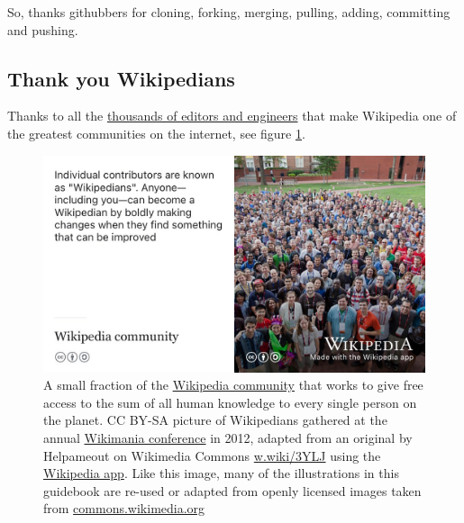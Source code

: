 \documentclass[
]{book}
\begin{document}
So, thanks githubbers for cloning, forking, merging, pulling, adding, committing and pushing. 🙏

\hypertarget{wikipedians}{%
\subsection{Thank you Wikipedians}\label{wikipedians}}

Thanks to all the \href{https://en.wikipedia.org/wiki/Wikipedia:Wikipedians}{thousands of editors and engineers} that make Wikipedia one of the greatest communities on the internet, see figure \ref{fig:wikipedians-fig}.

\begin{figure}

{\centering \includegraphics[width=0.99\linewidth]{images/wikipedians} 

}

\caption{A small fraction of the \href{https://en.wikipedia.org/wiki/Wikipedia_community}{Wikipedia community} that works to give free access to the sum of all human knowledge to every single person on the planet. CC BY-SA picture of Wikipedians gathered at the annual \href{https://en.wikipedia.org/wiki/Wikimania}{Wikimania conference} in 2012, adapted from an original by Helpameout on Wikimedia Commons \href{https://w.wiki/3YLJ}{w.wiki/3YLJ} using the \href{https://apps.apple.com/us/app/wikipedia/id324715238}{Wikipedia app}. Like this image, many of the illustrations in this guidebook are re-used or adapted from openly licensed images taken from \href{https://commons.wikimedia.org/}{commons.wikimedia.org}}\label{fig:wikipedians-fig}
\end{figure}
\end{document}
